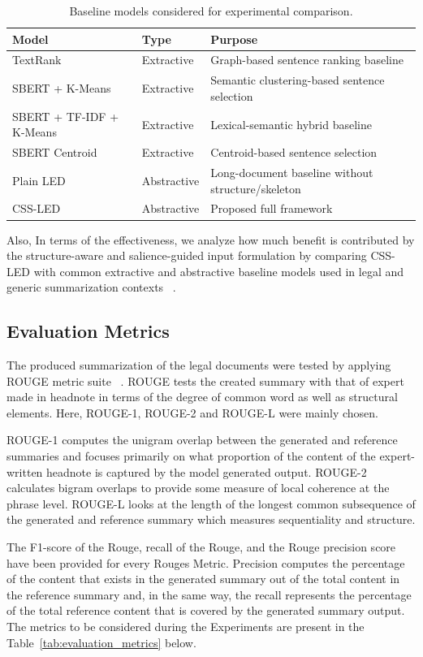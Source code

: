 \documentclass[11pt, a4paper]{article}
\theoremstyle{plain}%
\theoremstyle{remark}%
\theoremstyle{definition}%
\begin{document}
\begin{table}[H] \centering \caption{Baseline models considered for experimental comparison.} \begin{tabular}{lll} \hline Model & Type & Purpose \\ \hline TextRank ~\cite{b11} & Extractive & Graph-based sentence ranking baseline \\ SBERT + K-Means & Extractive & Semantic clustering-based sentence selection \\ SBERT + TF-IDF + K-Means & Extractive & Lexical-semantic hybrid baseline \\ SBERT Centroid & Extractive & Centroid-based sentence selection \\ Plain LED ~\cite{b21} & Abstractive & Long-document baseline without structure/skeleton \\ CSS-LED & Abstractive & Proposed full framework \\ \hline \end{tabular} \label{tab:baseline_models} \end{table} 

Also, In terms of the effectiveness, we analyze how much benefit is contributed by the structure-aware and salience-guided input formulation by comparing CSS-LED with common extractive and abstractive baseline models used in legal and generic summarization contexts ~\cite{b1, b2, b11, b18, b21}.

\subsection{Evaluation Metrics}

The produced summarization of the legal documents were tested by applying ROUGE metric suite ~\cite{b43}. ROUGE tests the created summary with that of expert made in headnote in terms of the degree of common word as well as structural elements. Here, ROUGE-1, ROUGE-2 and ROUGE-L were mainly chosen.

ROUGE-1 computes the unigram overlap between the generated and reference summaries and focuses primarily on what proportion of the content of the expert-written headnote is captured by the model generated output. ROUGE-2 calculates bigram overlaps to provide some measure of local coherence at the phrase level. ROUGE-L looks at the length of the longest common subsequence of the generated and reference summary which measures sequentiality and structure.

The F1-score of the Rouge, recall of the Rouge, and the Rouge precision score have been provided for every Rouges Metric. Precision computes the percentage of the content that exists in the generated summary out of the total content in the reference summary and, in the same way, the recall represents the percentage of the total reference content that is covered by the generated summary output. The metrics to be considered during the Experiments are present in the Table~\ref{tab:evaluation_metrics} below.
\end{document}

